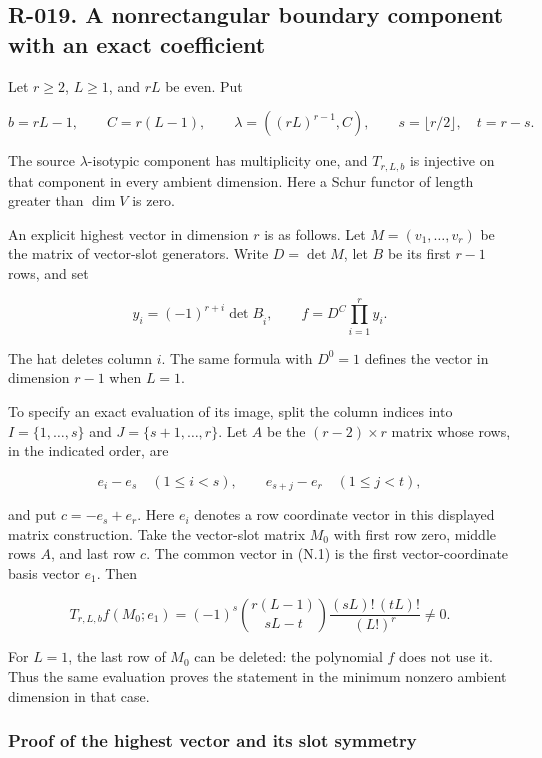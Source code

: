 \documentclass[
  10pt,
]{article}
\begin{document}
\subsection{R-019. A nonrectangular boundary component with an exact
coefficient}\label{r-019.-a-nonrectangular-boundary-component-with-an-exact-coefficient}

Let \(r\ge2\), \(L\ge1\), and \(rL\) be even. Put

\[
b=rL-1,\qquad C=r(L-1),\qquad
\lambda=((rL)^{r-1},C),\qquad
s=\lfloor r/2\rfloor,\quad t=r-s.
\tag{N.2}
\]

The source \(\lambda\)-isotypic component has multiplicity one, and
\(T_{r,L,b}\) is injective on that component in every ambient dimension.
Here a Schur functor of length greater than \(\dim V\) is zero.

An explicit highest vector in dimension \(r\) is as follows. Let
\(M=(v_1,\ldots,v_r)\) be the matrix of vector-slot generators. Write
\(D=\det M\), let \(B\) be its first \(r-1\) rows, and set

\[
y_i=(-1)^{r+i}\det B_{\widehat i},\qquad
f=D^C\prod_{i=1}^r y_i.
\tag{N.3}
\]

The hat deletes column \(i\). The same formula with \(D^0=1\) defines
the vector in dimension \(r-1\) when \(L=1\).

To specify an exact evaluation of its image, split the column indices
into \(I=\{1,\ldots,s\}\) and \(J=\{s+1,\ldots,r\}\). Let \(A\) be the
\((r-2)\times r\) matrix whose rows, in the indicated order, are

\[
e_i-e_s\quad(1\le i<s),\qquad
e_{s+j}-e_r\quad(1\le j<t),
\tag{N.4}
\]

and put \(c=-e_s+e_r\). Here \(e_i\) denotes a row coordinate vector in
this displayed matrix construction. Take the vector-slot matrix \(M_0\)
with first row zero, middle rows \(A\), and last row \(c\). The common
vector in (N.1) is the first vector-coordinate basis vector \(e_1\).
Then

\[
\boxed{
T_{r,L,b}f(M_0;e_1)
=(-1)^s
\binom{r(L-1)}{sL-t}
\frac{(sL)!\,(tL)!}{(L!)^r}
\ne0.}
\tag{N.5}
\]

For \(L=1\), the last row of \(M_0\) can be deleted: the polynomial
\(f\) does not use it. Thus the same evaluation proves the statement in
the minimum nonzero ambient dimension in that case.

\subsubsection{Proof of the highest vector and its slot
symmetry}\label{proof-of-the-highest-vector-and-its-slot-symmetry}
\end{document}
